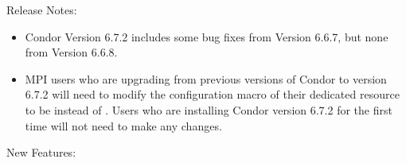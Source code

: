 \noindent Release Notes:

\begin{itemize}

\item Condor Version 6.7.2 includes some bug fixes from Version 6.6.7,
but none from Version 6.6.8.

\item MPI users who are upgrading from previous versions of Condor
to version 6.7.2 will need to modify the 
 configuration macro of their dedicated
resource to be  instead of .
Users who are installing Condor version 6.7.2
for the first time will not need to make any changes.

\end{itemize}


\noindent New Features:

